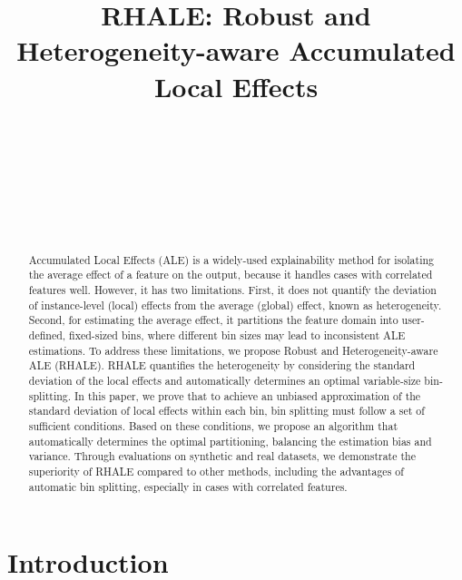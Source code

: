\documentclass{ecai}  %
\begin{document}
\begin{frontmatter}

\title{RHALE: Robust and Heterogeneity-aware Accumulated Local Effects}

\author[A, B]{~} %
\author[B]{~} %
\author[C]{~} %
\author[A]{~} %

\address[A]{Harokopio University of Athens}
\address[B]{ATHENA RC}
\address[C]{Universitat der Bundeswehr Munchen}

\begin{abstract}
Accumulated Local Effects (ALE) is a widely-used explainability method for isolating the average effect of a feature on the output, because it handles cases with correlated features well. However, it has two limitations. First, it does not quantify the deviation of instance-level (local) effects from the average (global) effect, known as heterogeneity. Second, for estimating the average effect, it partitions the feature domain into user-defined, fixed-sized bins, where different bin sizes may lead to inconsistent ALE estimations. To address these limitations, we propose Robust and Heterogeneity-aware ALE (RHALE). RHALE quantifies the heterogeneity by considering the standard deviation of the local effects and automatically determines an optimal variable-size bin-splitting. In this paper, we prove that to achieve an unbiased approximation of the standard deviation of local effects within each bin, bin splitting must follow a set of sufficient conditions. Based on these conditions, we propose an algorithm that automatically determines the optimal partitioning, balancing the estimation bias and variance. Through evaluations on synthetic and real datasets, we demonstrate the superiority of RHALE compared to other methods, including the advantages of automatic bin splitting, especially in cases with correlated features.
\end{abstract}

\end{frontmatter}

\section{Introduction}
\label{sec:intro}
\end{document}
